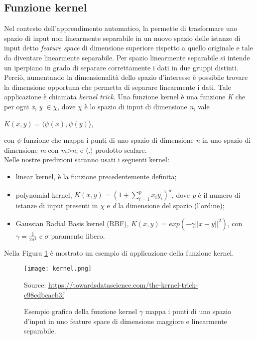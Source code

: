\subsection{Funzione kernel}
Nel contesto dell'apprendimento automatico, la \textit{\cite{kernel}} permette di trasformare uno spazio di input non linearmente separabile in un nuovo spazio delle istanze di input detto \emph{feature space} di dimensione superiore rispetto a quello originale e tale da diventare linearmente separabile. Per spazio linearmente separabile si intende un iperpiano in grado di separare correttamente i dati in due gruppi distinti. Perciò, aumentando la dimensionalità dello spazio d'interesse è possibile trovare la dimensione opportuna che permetta di separare linearmente i dati. Tale applicazione è chiamata \emph{kernel trick}. Una funzione kernel è una funzione \emph{K} che per ogni \emph{x}, \emph{y} $\in \chi$, dove $\chi$ è lo spazio di input di dimensione \emph{n}, vale 
\begin{center}
	$K(x,y) =  \langle\psi(x),\psi(y)\rangle $,
\end{center}
con $\psi$ funzione che mappa i punti di uno spazio di dimensione \emph{n} in uno spazio di dimensione \emph{m} con \emph{m>n}, e $\langle . \rangle$ prodotto scalare.\\
Nelle nostre predizioni saranno usati i seguenti kernel:
\begin{itemize}
	\item linear kernel, è la funzione precedentemente definita;
	\item polynomial kernel, $K(x,y) =  \left(1 + \sum_{i = 1}^{p}x_iy_i\right)^{d} $, dove \emph{p} è il numero di istanze di input presenti in $\chi$ e \emph{d} la dimensione del spazio (l'ordine);
	\item Gaussian Radial Basis kernel (RBF), $K(x,y) = exp(-\gamma||x-y||^2) $, con $\gamma=\frac{1}{2\sigma^2}$ e $\sigma$ paramento libero. 
\end{itemize}

Nella Figura \ref{fig:kernel} è mostrato un esempio di applicazione della funzione kernel.\\

\begin{figure}[h]
	\begin{center}
		\texttt{[image: kernel.png]}
		\caption{Esempio grafico della funzione kernel $\gamma$ mappa i punti di uno spazio d'input in uno feature space di dimensione maggiore e linearmente separabile.
		} 
		Source: \url{https://towardsdatascience.com/the-kernel-trick-c98cdbcaeb3f}\label{fig:kernel}
	\end{center}
\end{figure}

